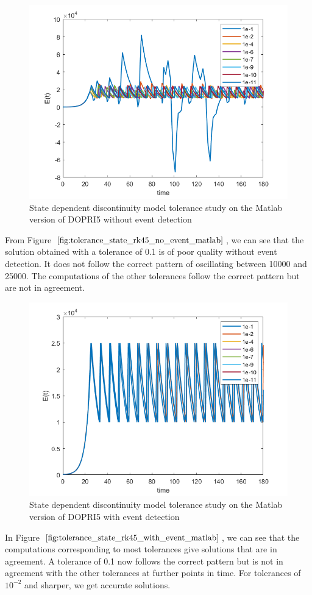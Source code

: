 \begin{figure}[h]
\centering
\includegraphics[width=0.7\linewidth]{./figures/tolerance_state_rk45_no_event_matlab}
\caption{State dependent discontinuity model tolerance study on the Matlab version of DOPRI5 without event detection}
\label{fig:tolerance_state_rk45_no_event_matlab}
\end{figure}

From Figure $\ref{fig:tolerance_state_rk45_no_event_matlab}$, we can see that the solution obtained with a tolerance of 0.1 is of poor quality without event detection. It does not follow the correct pattern of oscillating between 10000 and 25000. The computations of the other tolerances follow the correct pattern but are not in agreement.

\begin{figure}[h]
\centering
\includegraphics[width=0.7\linewidth]{./figures/tolerance_state_rk45_with_event_matlab}
\caption{State dependent discontinuity model tolerance study on the Matlab version of DOPRI5 with event detection}
\label{fig:tolerance_state_rk45_with_event_matlab}
\end{figure}
In Figure $\ref{fig:tolerance_state_rk45_with_event_matlab}$, we can see that the computations corresponding to most tolerances give solutions that are in agreement. A tolerance of 0.1 now follows the correct pattern but is not in agreement with the other tolerances at further points in time. For tolerances of $10^{-2}$ and sharper, we get accurate solutions.

